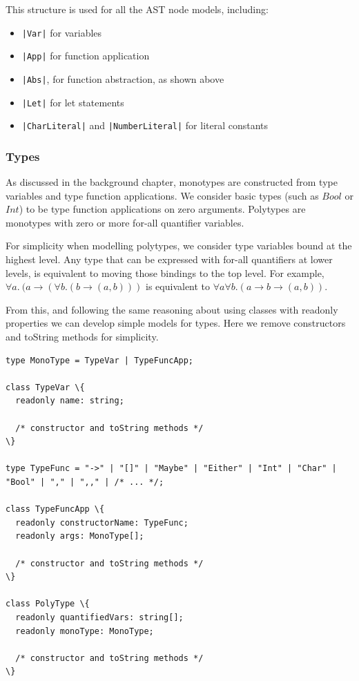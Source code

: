 \documentclass[a4paper,fleqn,oneside,12pt]{report}
\begin{document}
This structure is used for all the AST node models, including:
\begin{itemize}
  \item \texttt{|Var|} for variables
  \item \texttt{|App|} for function application
  \item \texttt{|Abs|}, for function abstraction, as shown above
  \item \texttt{|Let|} for let statements
  \item \texttt{|CharLiteral|} and \texttt{|NumberLiteral|} for literal constants
\end{itemize}

\subsubsection{Types}\label{id:h.bzdo56ibho4h}
As discussed in the background chapter, monotypes are constructed from type variables and type function applications. We consider basic types (such as $Bool$ or $Int$) to be type function applications on zero arguments. Polytypes are monotypes with zero or more for-all quantifier variables.

For simplicity when modelling polytypes, we consider type variables bound at the highest level. Any type that can be expressed with for-all quantifiers at lower levels, is equivalent to moving those bindings to the top level. For example, $\forall a.\ (a \rightarrow (\forall b. (b \rightarrow (a, b)))$ is equivalent to $\forall a \forall b. (a \rightarrow b \rightarrow (a, b))$.

From this, and following the same reasoning about using classes with readonly properties we can develop simple models for types. Here we remove constructors and toString methods for simplicity.

\begin{verbatim}
type MonoType = TypeVar | TypeFuncApp;

class TypeVar \{
  readonly name: string;

  /* constructor and toString methods */
\}

type TypeFunc = "->" | "[]" | "Maybe" | "Either" | "Int" | "Char" | "Bool" | "," | ",," | /* ... */;

class TypeFuncApp \{
  readonly constructorName: TypeFunc;
  readonly args: MonoType[];

  /* constructor and toString methods */
\}

class PolyType \{
  readonly quantifiedVars: string[];
  readonly monoType: MonoType;

  /* constructor and toString methods */
\}
\end{verbatim}
\end{document}
